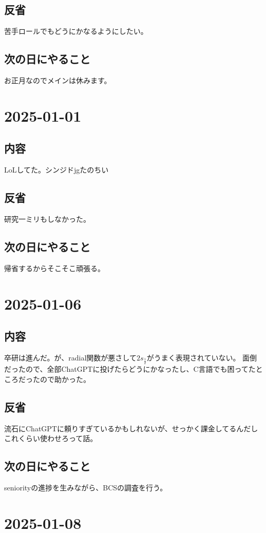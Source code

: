 \documentclass[a4paper,12pt]{jsreport}
\begin{document}
\subsection*{反省}
苦手ロールでもどうにかなるようにしたい。
\subsection*{次の日にやること}
お正月なのでメインは休みます。
\section*{2025-01-01}
\subsection*{内容}
LoLしてた。シンジドjgたのちい
\subsection*{反省}
研究一ミリもしなかった。
\subsection*{次の日にやること}
帰省するからそこそこ頑張る。
\section*{2025-01-06}
\subsection*{内容}
卒研は進んだ。が、radial関数が悪さして$2s_{\frac{1}{2}}$がうまく表現されていない。
面倒だったので、全部ChatGPTに投げたらどうにかなったし、C言語でも困ってたところだったので助かった。
\subsection*{反省}
流石にChatGPTに頼りすぎているかもしれないが、せっかく課金してるんだしこれくらい使わせろって話。
\subsection*{次の日にやること}
seniorityの進捗を生みながら、BCSの調査を行う。
\section*{2025-01-08}
\end{document}
